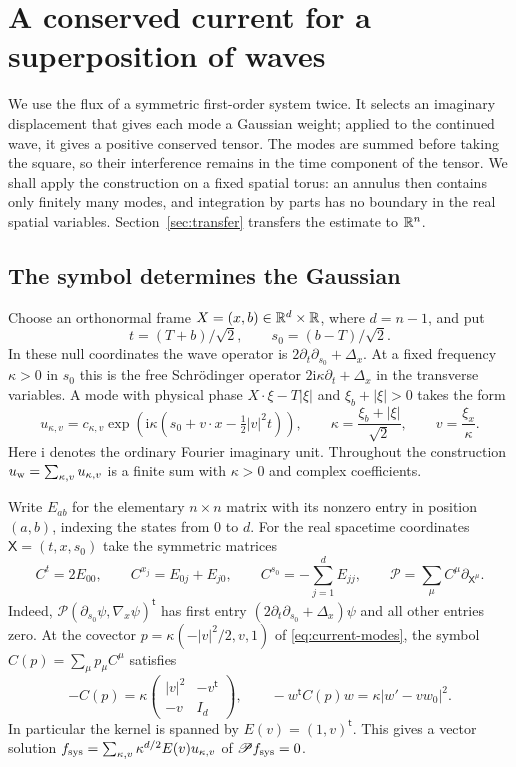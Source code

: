\section{A conserved current for a superposition of waves}\label{sec:current}

We use the flux of a symmetric first-order system twice. It selects an
imaginary displacement that gives each mode a Gaussian weight; applied
to the continued wave, it gives a positive conserved tensor. The modes
are summed before taking the square, so their interference remains in
the time component of the tensor. We shall apply the construction on a
fixed spatial torus: an annulus then contains only finitely many modes,
and integration by parts has no boundary in the real spatial variables.
Section~\ref{sec:transfer} transfers the estimate to $\mathbb R^n$.

\subsection{The symbol determines the Gaussian}

Choose an orthonormal frame $X=(x,b)\in\mathbb R^d\times\mathbb R$, where $d=n-1$,
and put
\[
 t=(T+b)/\sqrt2,\qquad s_0=(b-T)/\sqrt2 .
\]
In these null coordinates the wave operator is
$2\partial_t\partial_{s_0}+\Delta_x$. At a fixed frequency $\kappa>0$
in $s_0$ this is the free Schr\"odinger operator
$2\mathrm i\kappa\partial_t+\Delta_x$ in the transverse variables.
A mode with physical phase
$X\cdot\xi-T|\xi|$ and $\xi_b+|\xi|>0$ takes the form
\begin{equation}\label{eq:current-modes}
 u_{\kappa,v}
 =c_{\kappa,v}\exp\!\left(\mathrm i\kappa
    \left(s_0+v\cdot x-\tfrac12 |v|^2t\right)\right),
 \qquad \kappa=\frac{\xi_b+|\xi|}{\sqrt2},\qquad v=\frac{\xi_x}{\kappa}.
\end{equation}
Here $\mathrm i$ denotes the ordinary Fourier imaginary unit. Throughout
the construction $u_{\rm w}=\sum_{\kappa,v}u_{\kappa,v}$ is a finite
sum with $\kappa>0$ and complex coefficients.

Write $E_{ab}$ for the elementary $n\times n$ matrix with its nonzero
entry in position $(a,b)$, indexing the states from $0$ to $d$.
For the real spacetime coordinates $\mathsf X=(t,x,s_0)$ take the symmetric matrices
\[
 C^t=2E_{00},\qquad C^{x_j}=E_{0j}+E_{j0},\qquad
 C^{s_0}=-\sum_{j=1}^d E_{jj},\qquad
 \mathscr P=\sum_\mu C^\mu\partial_{\mathsf X^\mu}.
\]
Indeed, $\mathscr P(\partial_{s_0}\psi,\nabla_x\psi)^{\mathsf t}$
has first entry $(2\partial_t\partial_{s_0}+\Delta_x)\psi$ and all
other entries zero. At the covector $p=\kappa(-|v|^2/2,v,1)$ of
\eqref{eq:current-modes}, the symbol $C(p)=\sum_\mu p_\mu C^\mu$
satisfies
\begin{equation}\label{eq:current-wave-symbol}
 -C(p)=\kappa\begin{pmatrix}|v|^2&-v^{\mathsf t}\\-v&I_d\end{pmatrix},
 \qquad
 -w^{\mathsf t}C(p)w=\kappa|w'-vw_0|^2 .
\end{equation}
In particular the kernel is spanned by $E(v)=(1,v)^{\mathsf t}$.
This gives a vector solution
$f_{\rm sys}=\sum_{\kappa,v}\kappa^{d/2}E(v)u_{\kappa,v}$ of
$\mathscr P f_{\rm sys}=0$.

